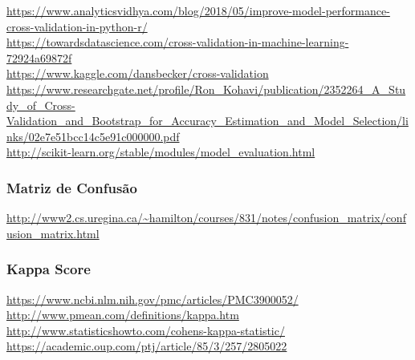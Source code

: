 \documentclass[12pt]{article}
\begin{document}
		\url{https://www.analyticsvidhya.com/blog/2018/05/improve-model-performance-cross-validation-in-python-r/}\\
		\url{https://towardsdatascience.com/cross-validation-in-machine-learning-72924a69872f}\\
		\url{https://www.kaggle.com/dansbecker/cross-validation}\\
		\url{https://www.researchgate.net/profile/Ron_Kohavi/publication/2352264_A_Study_of_Cross-Validation_and_Bootstrap_for_Accuracy_Estimation_and_Model_Selection/links/02e7e51bcc14c5e91c000000.pdf}\\
		\url{http://scikit-learn.org/stable/modules/model_evaluation.html}
		
	\subsubsection{Matriz de Confusão}
	
		\url{http://www2.cs.uregina.ca/~hamilton/courses/831/notes/confusion_matrix/confusion_matrix.html}\\
		
	\subsubsection{Kappa Score}
	
		\url{https://www.ncbi.nlm.nih.gov/pmc/articles/PMC3900052/}\\
		\url{http://www.pmean.com/definitions/kappa.htm}\\
		\url{http://www.statisticshowto.com/cohens-kappa-statistic/}\\
		\url{https://academic.oup.com/ptj/article/85/3/257/2805022}
		
\end{document}
